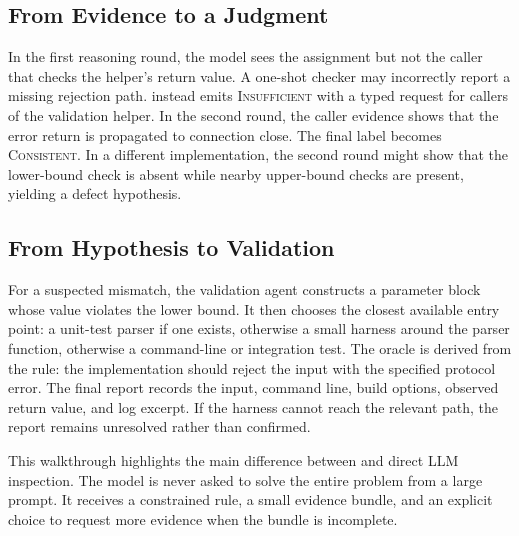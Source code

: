 \subsection{From Evidence to a Judgment}

In the first reasoning round, the model sees the assignment but not the caller
that checks the helper's return value. A one-shot checker may incorrectly report
a missing rejection path. \tool{} instead emits \textsc{Insufficient} with a
typed request for callers of the validation helper. In the second round, the
caller evidence shows that the error return is propagated to connection close.
The final label becomes \textsc{Consistent}. In a different implementation, the
second round might show that the lower-bound check is absent while nearby
upper-bound checks are present, yielding a defect hypothesis.

\subsection{From Hypothesis to Validation}

For a suspected mismatch, the validation agent constructs a parameter block
whose value violates the lower bound. It then chooses the closest available
entry point: a unit-test parser if one exists, otherwise a small harness around
the parser function, otherwise a command-line or integration test. The oracle is
derived from the rule: the implementation should reject the input with the
specified protocol error. The final report records the input, command line,
build options, observed return value, and log excerpt. If the harness cannot
reach the relevant path, the report remains unresolved rather than confirmed.

This walkthrough highlights the main difference between \tool{} and direct LLM
inspection. The model is never asked to solve the entire problem from a large
prompt. It receives a constrained rule, a small evidence bundle, and an explicit
choice to request more evidence when the bundle is incomplete.
